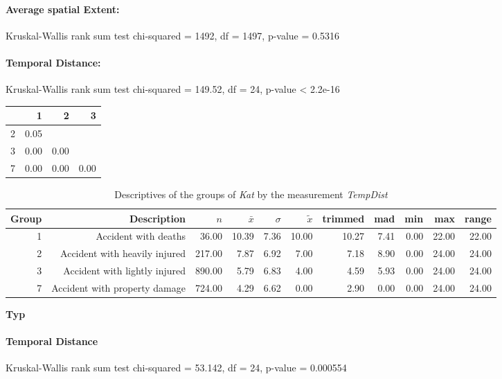 \paragraph{Average spatial Extent:}
Kruskal-Wallis rank sum test chi-squared = 1492, df = 1497, p-value = 0.5316

\paragraph{Temporal Distance:}
Kruskal-Wallis rank sum test chi-squared = 149.52, df = 24, p-value < 2.2e-16

\begin{tabular}{rrrr}
  	\toprule
 	& 1 & 2 & 3 \\ 
  	\midrule
	2 & 0.05 &  &  \\ 
  	3 & 0.00 & 0.00 &  \\ 
  	7 & 0.00 & 0.00 & 0.00 \\ 
   	\bottomrule
\end{tabular}

\begin{table}[ht]
	\small
	\centering
	\begin{tabular}{rrrrrrrrrrr}
	  	\toprule
		Group & Description & $n$ & $\bar{x}$ & $\sigma$ & $\tilde{x}$ & trimmed & mad & min & max & range \\ 
	  	\midrule
		1 & Accident with deaths & 36.00 & 10.39 & 7.36 & 10.00 & 10.27 & 7.41 & 0.00 & 22.00 & 22.00 \\ 
	  	2 & Accident with heavily injured & 217.00 & 7.87 & 6.92 & 7.00 & 7.18 & 8.90 & 0.00 & 24.00 & 24.00 \\ 
	  	3 & Accident with lightly injured & 890.00 & 5.79 & 6.83 & 4.00 & 4.59 & 5.93 & 0.00 & 24.00 & 24.00 \\ 
	  	7 & Accident with property damage & 724.00 & 4.29 & 6.62 & 0.00 & 2.90 & 0.00 & 0.00 & 24.00 & 24.00 \\ 
	   	\bottomrule
	\end{tabular}
	\caption{Descriptives of the groups of \textit{Kat} by the measurement \textit{TempDist}}
\end{table}

\large
\centerline{\textbf{Typ}}
\normalsize

\paragraph{Temporal Distance}
Kruskal-Wallis rank sum test chi-squared = 53.142, df = 24, p-value = 0.000554

